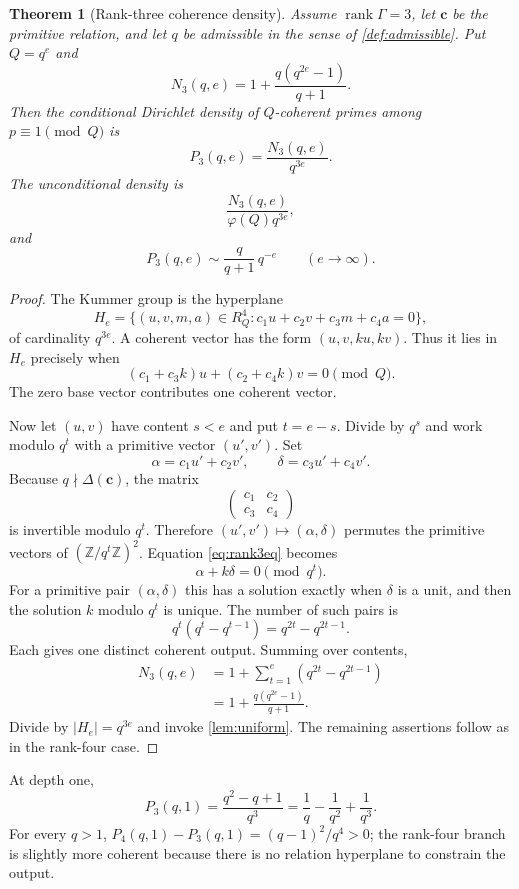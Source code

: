 \documentclass[11pt]{article}
\newtheorem{theorem}{Theorem}[section]
\theoremstyle{definition}
\theoremstyle{remark}
\newcommand{\Z}{\mathbb{Z}}
\newcommand{\rank}{\operatorname{rank}}
\begin{document}
\begin{theorem}[Rank-three coherence density]\label{thm:rank3density}
Assume $\rank\Gamma=3$, let $\bm c$ be the primitive relation, and let $q$ be admissible in
the sense of \cref{def:admissible}.  Put $Q=q^e$ and
\[
 N_3(q,e)
 =1+\frac{q(q^{2e}-1)}{q+1}.
 \tag{4.7}\label{eq:N3}
\]
Then the conditional Dirichlet density of $Q$-coherent primes among
$p\equiv1\pmod Q$ is
\[
       P_3(q,e)=\frac{N_3(q,e)}{q^{3e}}.
       \tag{4.8}\label{eq:P3}
\]
The unconditional density is
\[
       \frac{N_3(q,e)}{\varphi(Q)q^{3e}},
\]
and
\[
       P_3(q,e)\sim\frac{q}{q+1}\,q^{-e}
       \qquad(e\to\infty).
       \tag{4.9}\label{eq:P3asym}
\]
\end{theorem}
\begin{proof}
The Kummer group is the hyperplane
\[
 H_e=\{(u,v,m,a)\in R_Q^4:
        c_1u+c_2v+c_3m+c_4a=0\},
\]
of cardinality $q^{3e}$.  A coherent vector has the form
$(u,v,ku,kv)$.  Thus it lies in $H_e$ precisely when
\[
       (c_1+c_3k)u+(c_2+c_4k)v=0\pmod Q.
       \tag{4.10}\label{eq:rank3eq}
\]
The zero base vector contributes one coherent vector.

Now let $(u,v)$ have content $s<e$ and put $t=e-s$.  Divide by $q^s$ and work modulo
$q^t$ with a primitive vector $(u',v')$.  Set
\[
   \alpha=c_1u'+c_2v',\qquad
   \delta=c_3u'+c_4v'.
\]
Because $q\nmid\Delta(\bm c)$, the matrix
\[
      \begin{pmatrix}c_1&c_2\\c_3&c_4\end{pmatrix}
\]
is invertible modulo $q^t$.  Therefore $(u',v')\mapsto(\alpha,\delta)$ permutes the
primitive vectors of $(\Z/q^t\Z)^2$.  Equation \eqref{eq:rank3eq} becomes
\[
        \alpha+k\delta=0\pmod{q^t}.
\]
For a primitive pair $(\alpha,\delta)$ this has a solution exactly when $\delta$ is a unit,
and then the solution $k$ modulo $q^t$ is unique.  The number of such pairs is
\[
       q^t(q^t-q^{t-1})=q^{2t}-q^{2t-1}.
\]
Each gives one distinct coherent output.  Summing over contents,
\[
\begin{split}
 N_3(q,e)
   &=1+\sum_{t=1}^{e}(q^{2t}-q^{2t-1})\\
   &=1+\frac{q(q^{2e}-1)}{q+1}.
\end{split}
\]
Divide by $|H_e|=q^{3e}$ and invoke \cref{lem:uniform}.  The remaining assertions follow
as in the rank-four case.
\end{proof}

At depth one,
\[
        P_3(q,1)=\frac{q^2-q+1}{q^3}
        =\frac1q-\frac1{q^2}+\frac1{q^3}.
        \tag{4.11}
\]
For every $q>1$,
$P_4(q,1)-P_3(q,1)=(q-1)^2/q^4>0$; the rank-four branch is slightly more coherent because
there is no relation hyperplane to constrain the output.
\end{document}
